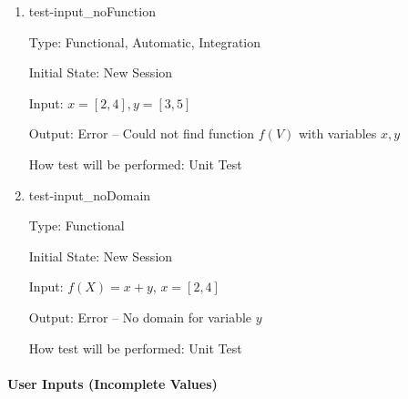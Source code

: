 \documentclass[12pt, titlepage]{article}
\begin{document}
\begin{enumerate}

	\item{test-input\_noFunction}
	
	Type: Functional, Automatic, Integration
	
	Initial State: New Session
	
	Input: $x = [2,4], y = [3,5]$
	
	Output: Error -- Could not find function $f(V)$ with variables $x, y$
	
	How test will be performed: Unit Test\\
	
	\item{test-input\_noDomain}
		
	Type: Functional
		
	Initial State: New Session
		
	Input: $f(X) = x + y$, $x = [2,4]$
		
	Output: Error -- No domain for variable $y$
		
	How test will be performed: Unit Test\\

\end{enumerate}

\paragraph{User Inputs (Incomplete Values)}
\end{document}
